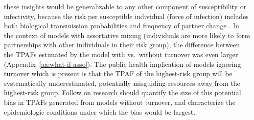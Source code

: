 these insights would be generalizable to
any other component of susceptibility or infectivity,
because the risk per susceptible individual (force of infection) includes both
biological transmission probabilities and frequency of partner change \citep{Anderson1991}.
In the context of models with assortative mixing
(individuals are more likely to form partnerships with
other individuals in their risk group),
the difference between the TPAFs estimated by the model
with vs.\ without turnover was even larger (Appendix~\ref{aa:what-if-asso}).
The public health implication of models ignoring turnover which is present
is that the TPAF of the highest-risk group will be systematically underestimated,
potentially misguiding resources away from the highest-risk group.
Follow on research should quantify the size of
this potential bias in TPAFs generated from models without turnover,
and characterize the epidemiologic conditions under which the bias would be largest.

